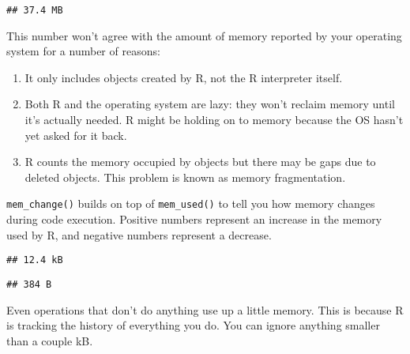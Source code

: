 \begin{verbatim}
## 37.4 MB
\end{verbatim}

This number won't agree with the amount of memory reported by your
operating system for a number of reasons:

\begin{enumerate}
\def\labelenumi{\arabic{enumi}.}
\item
  It only includes objects created by R, not the R interpreter itself.
\item
  Both R and the operating system are lazy: they won't reclaim memory
  until it's actually needed. R might be holding on to memory because
  the OS hasn't yet asked for it back.
\item
  R counts the memory occupied by objects but there may be gaps due to
  deleted objects. This problem is known as memory fragmentation.
\end{enumerate}

\texttt{mem\_change()} builds on top of \texttt{mem\_used()} to tell you
how memory changes during code execution. Positive numbers represent an
increase in the memory used by R, and negative numbers represent a
decrease. 

\begin{Shaded}
\begin{Highlighting}[]
\StringTok{ }\OperatorTok{:}\NormalTok{)}
\end{Highlighting}
\end{Shaded}

\begin{verbatim}
## 12.4 kB
\end{verbatim}

\begin{Shaded}
\begin{Highlighting}[]
\NormalTok{(}
\end{Highlighting}
\end{Shaded}

\begin{verbatim}
## 384 B
\end{verbatim}

Even operations that don't do anything use up a little memory. This is
because R is tracking the history of everything you do. You can ignore
anything smaller than a couple kB.

